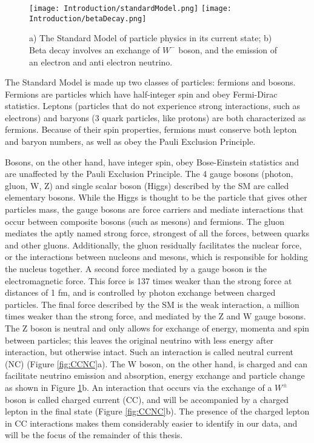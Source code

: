 \begin{figure}[h!]
\centering
\texttt{[image: Introduction/standardModel.png]}
\hspace{6 mm}
\texttt{[image: Introduction/betaDecay.png]}
\caption{a) The Standard Model of particle physics in its current state; b) Beta decay involves an exchange of $W^-$ boson, and the emission of an electron and anti electron neutrino. }
\label{fig:SM}
\end{figure}
\par The Standard Model is made up two classes of particles: fermions and bosons. Fermions are particles which have half-integer spin and obey Fermi-Dirac statistics. Leptons (particles that do not experience strong interactions, such as electrons) and baryons (3 quark particles, like protons) are both characterized as fermions. Because of their spin properties, fermions must conserve both lepton and baryon numbers, as well as obey the Pauli Exclusion Principle. 
\par Bosons, on the other hand, have integer spin, obey Bose-Einstein statistics and are unaffected by the Pauli Exclusion Principle. The 4 gauge bosons (photon, gluon, W, Z) and single scalar boson (Higgs) described by the SM are called elementary bosons. While the Higgs is thought to be the particle that gives other particles mass, the gauge bosons are force carriers and mediate interactions that occur between composite bosons (such as mesons) and fermions.  The gluon mediates the aptly named strong force, strongest of all the forces, between quarks and other gluons. Additionally, the gluon residually facilitates the nuclear force, or the interactions between nucleons and mesons, which is responsible for holding the nucleus together. A second force mediated by a gauge boson is the electromagnetic force.  This force is 137 times weaker than the strong force at distances of 1 fm, and is controlled by photon exchange between charged particles. The final force described by the SM is the weak interaction, a million times weaker than the strong force, and mediated by the Z and W gauge bosons. The Z boson is neutral and only allows for exchange of energy, momenta and spin between particles; this leaves the original neutrino with less energy after interaction, but otherwise intact. Such an interaction is called neutral current (NC) (Figure \ref{fig:CCNC}a). The W boson, on the other hand, is charged and can facilitate neutrino emission and absorption, energy exchange and particle change as shown in Figure \ref{fig:SM}b.  An interaction that occurs via the exchange of a $W^\pm$ boson is called charged current (CC), and will be accompanied by a charged lepton in the final state (Figure \ref{fig:CCNC}b). The presence of the charged lepton in CC interactions makes them considerably easier to identify in our data, and will be the focus of the remainder of this thesis. 

